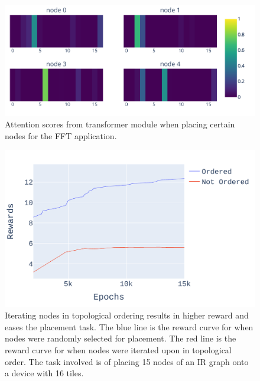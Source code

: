 \begin{figure}[tb]
  \centering
  \includegraphics[width=\linewidth]{fig/ifft_attention.pdf}
  \caption{Attention scores from transformer module when placing certain nodes for the FFT application. }
  \label{fig:ifft_attention}
\end{figure}

\begin{figure}[tb]
  \centering
  \includegraphics[width=\linewidth]{fig/plot_ordered.pdf}
  \caption{Iterating nodes in topological ordering results in higher reward and eases the placement task. 
 The blue line is the reward curve for when nodes were randomly selected for placement. 
 The red line is the reward curve for when nodes were iterated upon in topological order. 
 The task involved is of placing 15 nodes of an IR graph onto a device with 16 tiles.}
  \label{fig:ordered_placement}
\end{figure}

